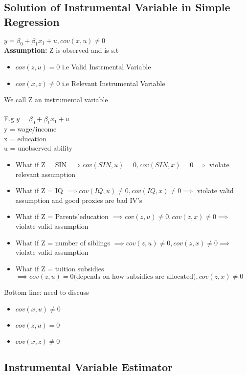 \documentclass{article}
\theoremstyle{definition}
\theoremstyle{thrm}
\theoremstyle{lma}
\theoremstyle{ppst}
\theoremstyle{crlr}
\begin{document}
\subsection{Solution of Instrumental Variable in Simple Regression}
$y = \beta_0+\beta_1x_1+u, cov(x,u)\neq 0$\\
\textbf{Assumption: }Z is observed and is s.t
\begin{itemize}
	\item $cov(z,u) = 0$ i.e Valid Instrmental Variable
	\item $cov(x,z)\neq 0$ i.e Relevant Instrumental Variable
\end{itemize}
We call Z an instrumental variable\\
\\
E.g $y = \beta_0+\beta_1x_1+u$\\
y = wage/income\\
x = education\\
u = unobserved ability
\begin{itemize}
	\item What if Z = SIN $\implies cov(SIN,u) = 0, cov(SIN,x) = 0 \implies $ violate relevant assumption
	\item What if Z = IQ $\implies cov(IQ,u) \neq 0, cov(IQ,x) \neq 0 \implies $ violate valid assumption and good proxies are bad IV's
	\item What if Z = Parents'education $\implies cov(z,u) \neq 0, cov(z,x) \neq 0 \implies $ violate valid assumption
	\item What if Z = number of siblings $\implies cov(z,u) \neq 0, cov(z,x) \neq 0 \implies $ violate valid assumption
	\item What if Z = tuition subsidies $\implies cov(z,u) = 0 \text{(depends on how subsidies are allocated)}, cov(z,x) \neq 0  $ 
\end{itemize}
Bottom line: need to discuss 
\begin{itemize}
	\item $cov(x,u)\neq 0$
	\item $cov(z,u) = 0$
	\item $cov(x,z)\neq 0$
\end{itemize}
\subsection{Instrumental Variable Estimator}
\end{document}
